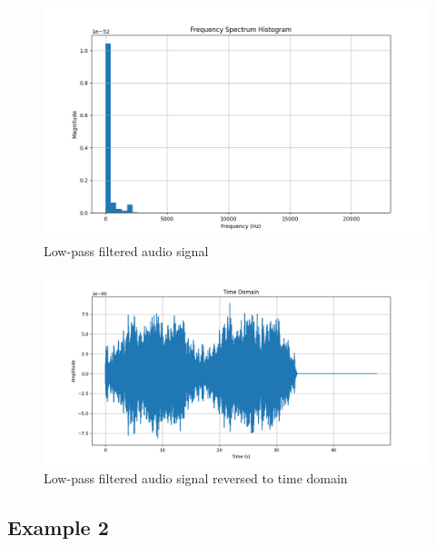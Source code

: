 \documentclass[a4paper,12pt,fleqn]{article}
\begin{document}
\begin{figure}[H]
    \centering
    \includegraphics[width=1\textwidth]{ex2_low_pass_filter.png}
    \caption{Low-pass filtered audio signal}
    \label{fig:ex2_high}
\end{figure}
\begin{figure}[H]
    \centering
    \includegraphics[width=1\textwidth]{ex2_low_pass_filter_time_domain.png}
    \caption{Low-pass filtered audio signal reversed to time domain}
    \label{fig:ex2_high_hist}
\end{figure}

\subsection{Example 2}
\end{document}

